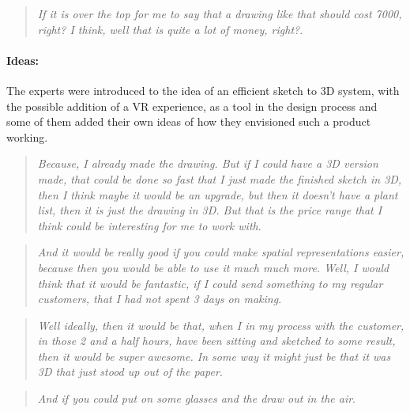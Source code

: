 \begin{quote}
	\textit{If it is over the top for me to say that a drawing like that should cost 7000, right? I think, well that is quite a lot of money, right?}\label{quote:expertRessources4}.\\
\end{quote}

\paragraph*{Ideas:}
The experts were introduced to the idea of an efficient sketch to 3D system, with the possible addition of a VR experience, as a tool in the design process and some of them added their own ideas of how they envisioned such a product working.
\begin{quote}
	\textit{Because, I already made the drawing. But if I could have a 3D version made, that could be done so fast that I just made the finished sketch in 3D, then I think maybe it would be an upgrade, but then it doesn't have a plant list, then it is just the drawing in 3D. But that is the price range that I think could be interesting for me to work with}\label{quote:expertIdeas1}.\\
\end{quote}

\begin{quote}
	\textit{And it would be really good if you could make spatial representations easier, because then you would be able to use it much much more. Well, I would think that it would be fantastic, if I could send something to my regular customers, that I had not spent 3 days on making}\label{quote:expertIdeas2}.\\
\end{quote}

\begin{quote}
	\textit{Well ideally, then it would be that, when I in my process with the customer, in those 2 and a half hours, have been sitting and sketched to some result, then it would be super awesome. In some way it might just be that it was 3D that just stood up out of the paper}\label{quote:expertIdeas3}.\\
\end{quote}

\begin{quote}
	\textit{And if you could put on some glasses and the draw out in the air}\label{quote:expertIdeas4}.\\
\end{quote}

